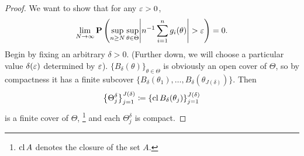 \documentclass[11pt,letterpaper,reqno,oneside]{article}
\begin{document}
\begin{proof}
	We want to show that for any $\varepsilon>0$,
	\begin{equation*}
		\lim_{N \to \infty} \PP\left(
		\sup_{n \geq N}
		\sup_{\theta \in \Theta} 
		\abs*{ n^{-1} \sum_{i=1}^n g_i(\theta) }
		> \eps \right)
		= 0 .
	\end{equation*}
	Begin by fixing an arbitrary $\delta>0$. (Further down, we will choose a particular value $\delta(\varepsilon)$ determined by $\varepsilon$). $\{ B_\delta(\theta) \}_{\theta \in \Theta}$ is obviously an open cover of $\Theta$, so by compactness it has a finite subcover $\bigl\{ B_\delta(\theta_1), \dots, B_\delta(\theta_{J(\delta)}) \bigr\}$. Then
	\begin{equation*}
		\bigl\{ \Theta^\delta_j \bigr\}_{j=1}^{J(\delta)} 
		\coloneqq \left\{ \operatorname*{cl} B_\delta(\theta_j) \right\}_{j=1}^{J(\delta)}
	\end{equation*}
	is a finite cover of $\Theta$,%
		\footnote{$\operatorname*{cl} A$ denotes the closure of the set $A$.}
	and each $\Theta^\delta_j$ is compact.



\end{proof}
\end{document}
